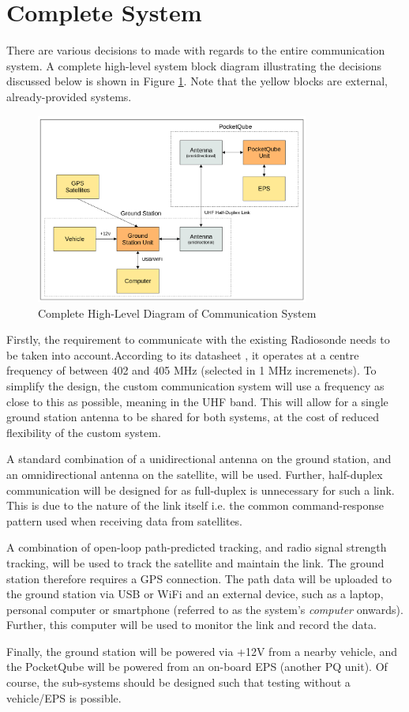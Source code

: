 \graphicspath{{./figures}}

\section{Complete System}
There are various decisions to made with regards to the entire communication system. A complete high-level system block diagram illustrating the decisions discussed below is shown in Figure \ref{fig:complete_system}. Note that the yellow blocks are external, already-provided systems.

\begin{figure}[!htb]
    \centering
    \includegraphics[width=0.8\textwidth]{complete_system.png}
    \caption{Complete High-Level Diagram of Communication System}
    \label{fig:complete_system}
  \end{figure}

Firstly, the requirement to communicate with the existing Radiosonde needs to be taken into account.According to its datasheet \cite{datasheet-iMet54}, it operates at a centre frequency of between 402 and 405 MHz (selected in 1 MHz incremenets). To simplify the design, the custom communication system will use a frequency as close to this as possible, meaning in the UHF band. This will allow for a single ground station antenna to be shared for both systems, at the cost of reduced flexibility of the custom system.

A standard combination of a unidirectional antenna on the ground station, and an omnidirectional antenna on the satellite, will be used. Further, half-duplex communication will be designed for as full-duplex is unnecessary for such a link. This is due to the nature of the link itself i.e. the common command-response pattern used when receiving data from satellites.

A combination of open-loop path-predicted tracking, and radio signal strength tracking, will be used to track the satellite and maintain the link. The ground station therefore requires a GPS connection. The path data will be uploaded to the ground station via USB or WiFi and an external device, such as a laptop, personal computer or smartphone (referred to as the system's \textit{computer} onwards). Further, this computer will be used to monitor the link and record the data.

Finally, the ground station will be powered via +12V from a nearby vehicle, and the PocketQube will be powered from an on-board EPS (another PQ unit). Of course, the sub-systems should be designed such that testing without a vehicle/EPS is possible.
